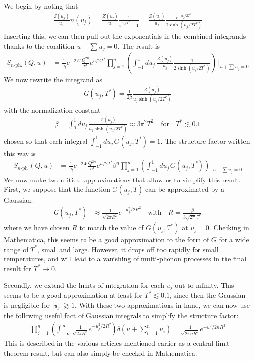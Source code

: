 \documentclass{article}
\begin{document}
We begin by noting that
\begin{align}
\frac{Z(u_j)}{u_j} n(u_j) = \frac{Z(u_j)}{u_j} \frac{1}{e^{u_j/T^*} - 1} = \frac{Z(u_j)}{u_j} \frac{e^{-u_j/2T^*}}{2\sinh(u_j/2T^*)}
\end{align}
Inserting this, we can then pull out the exponentials in the combined integrands thanks to the condition $u + \sum u_j = 0$. The result is
\begin{align}
S_{n\text{-ph.}}(Q, u) &= \frac{1}{\omega_l} e^{-2 W} \frac{Q^{2 n}}{n!} e^{u/2T^*} \prod_{j = 1}^n \left( \int_{-1}^1 du_j\, \frac{Z(u_j)}{u_j} \frac{1}{2\sinh(u_j/2T^*)} \right)\,\bigg|_{u + \sum u_j = 0}
\end{align}
We now rewrite the integrand as
\begin{align}
G(u_j, T^*) = \frac{1}{2 \beta} \frac{Z(u_j)}{u_j\sinh(u_j / 2 T^*)}
\end{align}
with the normalization constant
\begin{align}
\beta = \int_0^1 du_j\, \frac{Z(u_j)}{u_j\sinh(u_j / 2 T^*)} \approx 3 \pi^2 T^2 \quad\text{for}\quad T^*\lesssim 0.1
\end{align}
chosen so that each integral $\int_{-1}^1 du_j\, G(u_j, T^*) = 1$. The structure factor written this way is
\begin{align}
S_{n\text{-ph.}}(Q, u) &= \frac{1}{\omega_l} e^{-2 W} \frac{Q^{2 n}}{n!} e^{u/2T^*} \beta^n \prod_{j = 1}^n \left( \int_{-1}^1 du_j\, G(u_j, T^*) \right)\,\bigg|_{u + \sum u_j = 0}
\end{align}
We now make two critical approximations that allow us to simplify this result. First, we suppose that the function $G(u_j, T)$ can be approximated by a Gaussian:
\begin{align}
G(u_j, T^*) &\approx \frac{1}{\sqrt{2 \pi R^2}} e^{-u_j^2 / 2 R^2} \quad\text{with}\quad R = \frac{\beta}{3\sqrt{2 \pi}\, T^*}
\end{align}
where we have chosen $R$ to match the value of $G(u_j, T^*)$ at $u_j = 0$. Checking in Mathematica, this seems to be a good approximation to the form of $G$ for a wide range of $T^*$, small and large. However, it drops off too rapidly for small temperatures, and will lead to a vanishing of multi-phonon processes in the final result for $T^*\to 0$.

Secondly, we extend the limits of integration for each $u_j$ out to infinity. This seems to be a good approximation at least for $T^*\lesssim 0.1$, since then the Gaussian is negligible for $|u_j|\gtrsim1$. With these two approximations in hand, we can now use the following useful fact of Gaussian integrals to simplify the structure factor:
\begin{align}
\prod_{j = 1}^n \left( \int_{-\infty}^\infty \frac{1}{\sqrt{2 \pi R^2}} e^{-u_j^2 / 2 R^2} \right) \delta\left(u + \sum_{i = 1}^n u_i \right) = \frac{1}{\sqrt{2 \pi n R^2}} e^{-u^2 / 2 nR^2}
\end{align}
This is described in the various articles mentioned earlier as a central limit theorem result, but can also simply be checked in Mathematica.
\end{document}
